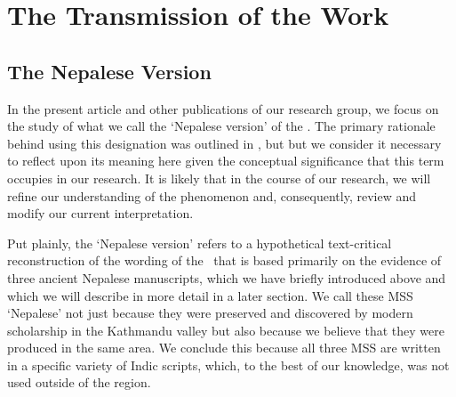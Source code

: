\section{The Transmission of the Work}
\subsection{The Nepalese Version}

In the present article and other publications of our research group, we focus on the study of what we call the `Nepalese version' of the \SS. The primary rationale behind using this designation was outlined in \citet[2-3]{kleb-2021b}, but but we consider it necessary to reflect upon its meaning here given the conceptual significance that this term occupies in our research.
It is likely that in the course of our research, we will refine our understanding of the phenomenon and, consequently, review and modify our current interpretation.%

Put plainly, the `Nepalese version' refers to a hypothetical text-critical reconstruction of the wording of the \SS\ that is based primarily on the evidence of three ancient Nepalese manuscripts, which we have briefly introduced above and which we will describe in more detail in a later section.  We call these MSS `Nepalese' not just because they were preserved and discovered by modern scholarship 
in the 
Kathmandu valley
but also because we believe that they were produced in the same area. We conclude this because all three MSS are written in a specific variety of Indic scripts, which, to the best of our knowledge, was not used outside of the region. 

